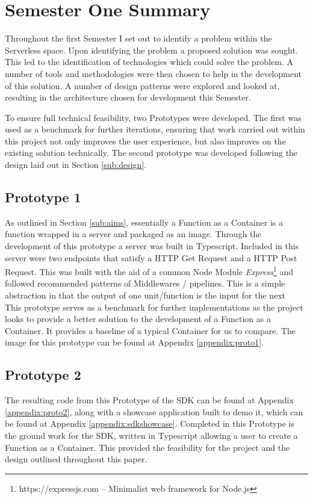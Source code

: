 \section{Semester One Summary}
\label{sub:poc}
Throughout the first Semester I set out to identify a problem within the \gls{Serverless} space. Upon identifying the problem a proposed solution was sought. This led to the identification of technologies which could solve the problem. A number of tools and methodologies were then chosen to help in the development of this solution. A number of design patterns were explored and looked at, resulting in the architecture chosen for development this Semester. 

To ensure full technical feasibility, two Prototypes were developed. The first was used as a benchmark for further iterations, ensuring that work carried out within this project not only improves the user experience, but also improves on the existing solution technically. The second prototype was developed following the design laid out in Section \ref{sub:design}.

\subsection{Prototype 1}
\label{sub:proto1}
As outlined in Section \ref{sub:aims}, essentially a Function as a Container is a function wrapped in a server and packaged as an image. Through the development of this prototype a server was built in Typescript. Included in this server were two endpoints that satisfy a HTTP Get Request and a HTTP Post Request. This was built with the aid of a common Node Module \textit{Express}\footnote{https://expressjs.com -- Minimalist web framework for Node.js} and followed recommended patterns of Middlewares / pipelines. This is a simple abstraction in that the output of one unit/function is the input for the next
\\This prototype serves as a benchmark for further implementations as the project looks to provide a better solution to the development of a Function as a Container. It provides a baseline of a typical Container for us to compare. The image for this prototype can be found at Appendix \ref{appendix:proto1}.

\subsection{Prototype 2}
\label{sub:proto2}
The resulting code from this Prototype of the SDK can be found at Appendix \ref{appendix:proto2}, along with a showcase application built to demo it, which can be found at Appendix \ref{appendix:sdkshowcase}. Completed in this Prototype is the ground work for the SDK, written in Typescript allowing a user to create a Function as a Container. This provided the feasibility for the project and the design outlined throughout this paper.

